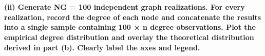 \documentclass[11pt]{article}
\begin{document}
    \begin{center}
    \end{center}
    { \hspace*{\fill} \\}
    
    \paragraph{(ii) Generate NG = 100 independent graph realizations. For
every realization, record the degree of each node and concatenate the
results into a single sample containing 100 × n degree observations. Plot
the empirical degree distribution and overlay the
theoretical distribution derived in part (b). Clearly label the axes and
legend.}\label{ii-generate-ng-100-independent-graph-realizations.-for-every-realization-record-thedegree-of-each-node-and-concatenate-the-results-into-a-single-sample-containing-100-ndegree-observations.-plot-the-empirical-degree-distribution-and-overlay-the-theoreticaldistribution-derived-in-part-b.-clearly-label-the-axes-and-legend.}
\end{document}
